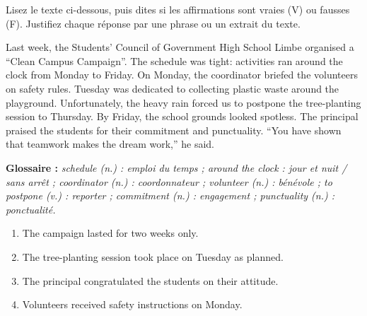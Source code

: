 \documentclass[11pt]{article}
\newcommand{\cle}[1]{{\popxbold\color{popdark}#1}}
\begin{document}
\begin{exercice}
Lisez le texte ci-dessous, puis dites si les affirmations sont vraies (V) ou fausses (F). Justifiez chaque réponse par une phrase ou un extrait du texte.
\begin{textebox}
Last week, the Students' Council of Government High School Limbe organised a “Clean Campus Campaign”. The \cle{schedule} was tight: activities ran \cle{around the clock} from Monday to Friday. On Monday, the \cle{coordinator} briefed the \cle{volunteers} on safety rules. Tuesday was dedicated to collecting plastic waste around the playground. Unfortunately, the heavy rain \cle{forced} us to \cle{postpone} the tree-planting session to Thursday. By Friday, the school grounds looked spotless. The principal praised the students for their \cle{commitment} and \cle{punctuality}. “You have shown that teamwork makes the dream work,” he said.

\medskip
\textbf{Glossaire :} \textit{schedule (n.) : emploi du temps ; around the clock : jour et nuit / sans arrêt ; coordinator (n.) : coordonnateur ; volunteer (n.) : bénévole ; to postpone (v.) : reporter ; commitment (n.) : engagement ; punctuality (n.) : ponctualité.}
\end{textebox}
\begin{enumerate}
\item The campaign lasted for two weeks only.
\item The tree-planting session took place on Tuesday as planned.
\item The principal congratulated the students on their attitude.
\item Volunteers received safety instructions on Monday.
\end{enumerate}
\end{exercice}
\end{document}
